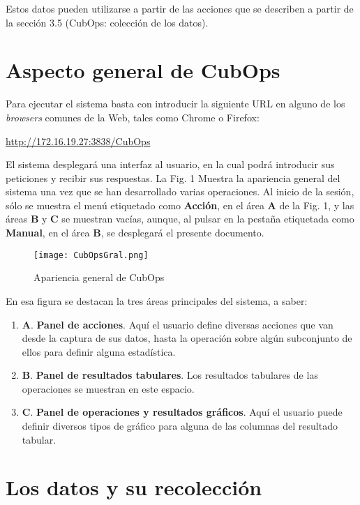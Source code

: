 \documentclass[spanish,]{article}
\providecommand{\tightlist}{%
  \setlength{\itemsep}{0pt}\setlength{\parskip}{0pt}}
\begin{document}
Estos datos pueden utilizarse a partir de las acciones que se describen
a partir de la sección 3.5 (CubOps: colección de los datos).

\section{Aspecto general de CubOps}\label{aspecto-general-de-cubops}

Para ejecutar el sistema basta con introducir la siguiente URL en alguno
de los \emph{browsers} comunes de la Web, tales como Chrome o Firefox:

\url{http://172.16.19.27:3838/CubOps}

El sistema desplegará una interfaz al usuario, en la cual podrá
introducir sus peticiones y recibir sus respuestas. La Fig. 1 Muestra la
apariencia general del sistema una vez que se han desarrollado varias
operaciones. Al inicio de la sesión, sólo se muestra el menú etiquetado
como \textbf{Acción}, en el área \textbf{A} de la Fig. 1, y las áreas
\textbf{B} y \textbf{C} se muestran vacías, aunque, al pulsar en la
pestaña etiquetada como \textbf{Manual}, en el área \textbf{B}, se
desplegará el presente documento.

\begin{figure}
\centering
\texttt{[image: CubOpsGral.png]}
\caption{Apariencia general de CubOps}
\end{figure}

En esa figura se destacan la tres áreas principales del sistema, a
saber:

\begin{enumerate}
\def\labelenumi{\arabic{enumi}.}
\tightlist
\item
  \textbf{A}. \textbf{Panel de acciones}. Aquí el usuario define
  diversas acciones que van desde la captura de sus datos, hasta la
  operación sobre algún subconjunto de ellos para definir alguna
  estadística.
\item
  \textbf{B}. \textbf{Panel de resultados tabulares}. Los resultados
  tabulares de las operaciones se muestran en este espacio.
\item
  \textbf{C}. \textbf{Panel de operaciones y resultados gráficos}. Aquí
  el usuario puede definir diversos tipos de gráfico para alguna de las
  columnas del resultado tabular.
\end{enumerate}

\section{Los datos y su recolección}\label{los-datos-y-su-recoleccion}
\end{document}
